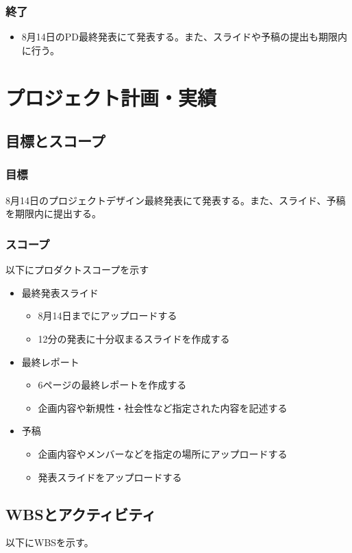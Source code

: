 \documentclass[11pt,a4paper]{jsarticle}
\begin{document}
\subsubsection{終了}
\begin{itemize}
\item 8月14日のPD最終発表にて発表する。また、スライドや予稿の提出も期限内に行う。
\end{itemize}


\section{プロジェクト計画・実績}
\subsection{目標とスコープ}
\subsubsection{目標}
8月14日のプロジェクトデザイン最終発表にて発表する。また、スライド、予稿を期限内に提出する。
\subsubsection{スコープ}
以下にプロダクトスコープを示す
\begin{itemize}
\item 最終発表スライド
\begin{itemize}
\item 8月14日までにアップロードする
\item 12分の発表に十分収まるスライドを作成する
\end{itemize}
\item 最終レポート
\begin{itemize}
\item 6ページの最終レポートを作成する
\item 企画内容や新規性・社会性など指定された内容を記述する
\end{itemize}
\item 予稿
\begin{itemize}
\item 企画内容やメンバーなどを指定の場所にアップロードする
\item 発表スライドをアップロードする
\end{itemize}
\end{itemize}

\subsection{WBSとアクティビティ}
以下にWBSを示す。
\end{document}
